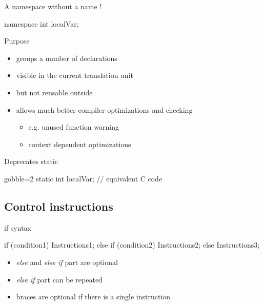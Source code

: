 \begin{frame}[fragile]
  \begin{exampleblock}{A namespace without a name !}
    \begin{cppcode*}{}
      namespace {
        int localVar;
      }
    \end{cppcode*}
  \end{exampleblock}
  \begin{block}{Purpose}
    \begin{itemize}
    \item groups a number of declarations
    \item visible in the current translation unit
    \item but not reusable outside
    \item allows much better compiler optimizations and checking
      \begin{itemize}
      \item e.g. unused function warning
      \item context dependent optimizations
      \end{itemize}
    \end{itemize}
  \end{block}
  \begin{alertblock}{Deprecates static}
    \begin{cppcode*}{gobble=2}
      static int localVar; // equivalent C code
    \end{cppcode*}
  \end{alertblock}
\end{frame}


\subsection[Control]{Control instructions}

\begin{frame}[fragile]
  \begin{block}{if syntax}
    \begin{cppcode*}{}
      if (condition1) {
        Instructions1;
      } else if (condition2) {
        Instructions2;
      } else {
        Instructions3;
      } 
    \end{cppcode*}
    \begin{itemize}
      \item {\it else} and {\it else if} part are optional
      \item {\it else if} part can be repeated
      \item braces are optional if there is a single instruction
    \end{itemize}
  \end{block}
\end{frame}

